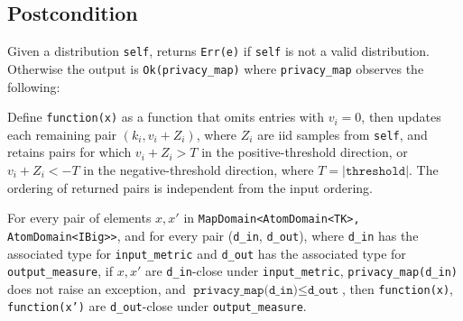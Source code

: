 \documentclass{article}
\begin{document}
\subsection*{Postcondition}
\begin{theorem}
    Given a distribution \texttt{self},
    returns \texttt{Err(e)} if \texttt{self} is not a valid distribution.
    Otherwise the output is \texttt{Ok(privacy\_map)}
    where \texttt{privacy\_map} observes the following:

    Define \texttt{function(x)} as a function that omits entries with $v_i = 0$,
    then updates each remaining pair $(k_i, v_i + Z_i)$,
    where $Z_i$ are iid samples from \texttt{self},
    and retains pairs for which $v_i + Z_i > T$ in the positive-threshold direction,
    or $v_i + Z_i < -T$ in the negative-threshold direction, where $T = |\texttt{threshold}|$.
    The ordering of returned pairs is independent from the input ordering.

    For every pair of elements $x, x'$ in \texttt{MapDomain<AtomDomain<TK>, AtomDomain<IBig>{}>},
    and for every pair (\texttt{d\_in}, \texttt{d\_out}),
    where \texttt{d\_in} has the associated type for \texttt{input\_metric} and \texttt{d\_out} has the associated type for \texttt{output\_measure},
    if $x, x'$ are \texttt{d\_in}-close under \texttt{input\_metric}, \texttt{privacy\_map(d\_in)} does not raise an exception,
    and $\texttt{privacy\_map(d\_in)} \leq \texttt{d\_out}$,
    then \texttt{function(x)}, \texttt{function(x')} are \texttt{d\_out}-close under \texttt{output\_measure}.
\end{theorem}
\end{document}

